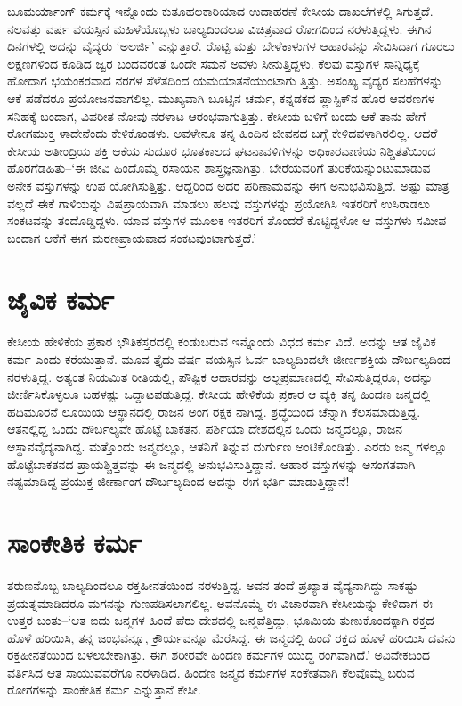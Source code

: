 ಬೂಮರ್ಯಾಂಗ್ ಕರ್ಮಕ್ಕೆ ಇನ್ನೊಂದು ಕುತೂಹಲಕಾರಿಯಾದ ಉದಾಹರಣೆ ಕೇಸೀಯ ದಾಖಲೆಗಳಲ್ಲಿ ಸಿಗುತ್ತದೆ. ನಲವತ್ತು ವರ್ಷ ವಯಸ್ಸಿನ ಮಹಿಳೆಯೊಬ್ಬಳು ಬಾಲ್ಯದಿಂದಲೂ ವಿಚಿತ್ರವಾದ ರೋಗದಿಂದ ನರಳುತ್ತಿದ್ದಳು. ಈಗಿನ ದಿನಗಳಲ್ಲಿ ಅದನ್ನು ವೈದ್ಯರು ‘ಅಲರ್ಜಿ’ ಎನ್ನುತ್ತಾರೆ. ರೊಟ್ಟಿ ಮತ್ತು ಬೇಳೆಕಾಳುಗಳ ಆಹಾರವನ್ನು ಸೇವಿಸಿದಾಗ ಗೂರಲು ಲಕ್ಷಣಗಳಿಂದ ಕೂಡಿದ ಜ್ವರ ಬಂದವರಂತೆ ಒಂದೇ ಸಮನೆ ಅವಳು ಸೀನುತ್ತಿದ್ದಳು. ಕೆಲವು ವಸ್ತುಗಳ ಸಾನ್ನಿಧ್ಯಕ್ಕೆ ಹೋದಾಗ ಭಯಂಕರವಾದ ನರಗಳ ಸೆಳೆತದಿಂದ ಯಮಯಾತನೆಯುಂಟಾಗು ತ್ತಿತ್ತು. ಅಸಂಖ್ಯ ವೈದ್ಯರ ಸಲಹೆಗಳನ್ನು ಆಕೆ ಪಡೆದರೂ ಪ್ರಯೋಜನವಾಗಲಿಲ್ಲ. ಮುಖ್ಯವಾಗಿ ಬೂಟ್ಸಿನ ಚರ್ಮ, ಕನ್ನಡಕದ ಪ್ಲಾಸ್ಟಿಕ್​ನ ಹೊರ ಆವರಣಗಳ ಸನಿಹಕ್ಕೆ ಬಂದಾಗ, ವಿಪರೀತ ನೋವು ನರಳಾಟ ಆರಂಭವಾಗುತ್ತಿತ್ತು. ಕೇಸೀಯ ಬಳಿಗೆ ಬಂದು ಆಕೆ ತಾನು ಹೇಗೆ ರೋಗಮುಕ್ತ ಳಾದೇನೆಂದು ಕೇಳಿಕೊಂಡಳು. ಅವಳೇನೂ ತನ್ನ ಹಿಂದಿನ ಜೀವನದ ಬಗ್ಗೆ ಕೇಳಿದವಳಾಗಿರಲಿಲ್ಲ. ಆದರೆ ಕೇಸೀಯ ಅತೀಂದ್ರಿಯ ಶಕ್ತಿ ಆಕೆಯ ಸುದೂರ ಭೂತಕಾಲದ ಘಟನಾವಳಿಗಳನ್ನು ಅಧಿಕಾರವಾಣಿಯ ನಿಶ್ಚಿತತೆಯಿಂದ ಹೊರಗೆಡಹಿತು–‘ಈ ಜೀವಿ ಹಿಂದೊಮ್ಮೆ ರಸಾಯನ ಶಾಸ್ತ್ರಜ್ಞನಾಗಿತ್ತು. ಬೇರೆಯವರಿಗೆ ತುರಿಕೆಯನ್ನುಂಟುಮಾಡುವ ಅನೇಕ ವಸ್ತುಗಳನ್ನು ಉಪ ಯೋಗಿಸುತ್ತಿತ್ತು. ಆದ್ದರಿಂದ ಅದರ ಪರಿಣಾಮವನ್ನು ಈಗ ಅನುಭವಿಸುತ್ತಿದೆ. ಅಷ್ಟು ಮಾತ್ರ ವಲ್ಲದೆ ಈಕೆ ಗಾಳಿಯನ್ನು ವಿಷಪ್ರಾಯವಾಗಿ ಮಾಡಲು ಹಲವು ವಸ್ತುಗಳನ್ನು ಪ್ರಯೋಗಿಸಿ ಇತರರಿಗೆ ಉಸಿರಾಡಲು ಸಂಕಟವನ್ನು ತಂದೊಡ್ಡಿದ್ದಳು. ಯಾವ ವಸ್ತುಗಳ ಮೂಲಕ ಇತರರಿಗೆ ತೊಂದರೆ ಕೊಟ್ಟಿದ್ದಳೋ ಆ ವಸ್ತುಗಳು ಸಮೀಪ ಬಂದಾಗ ಆಕೆಗೆ ಈಗ ಮರಣಪ್ರಾಯವಾದ ಸಂಕಟವುಂಟಾಗುತ್ತದೆ.’


\section{ಜೈವಿಕ ಕರ್ಮ}

ಕೇಸೀಯ ಹೇಳಿಕೆಯ ಪ್ರಕಾರ ಭೌತಿಕಸ್ತರದಲ್ಲಿ ಕಂಡುಬರುವ ಇನ್ನೊಂದು ವಿಧದ ಕರ್ಮ ವಿದೆ. ಅದನ್ನು ಆತ ಜೈವಿಕ ಕರ್ಮ  ಎಂದು ಕರೆಯುತ್ತಾನೆ. ಮೂವ ತ್ತೈದು ವರ್ಷ ವಯಸ್ಸಿನ ಓರ್ವ ಬಾಲ್ಯದಿಂದಲೇ ಜೀರ್ಣಶಕ್ತಿಯ ದೌರ್ಬಲ್ಯದಿಂದ ನರಳುತ್ತಿದ್ದ. ಅತ್ಯಂತ ನಿಯಮಿತ ರೀತಿಯಲ್ಲಿ, ಪೌಷ್ಟಿಕ ಆಹಾರವನ್ನು ಅಲ್ಪಪ್ರಮಾಣದಲ್ಲಿ ಸೇವಿಸುತ್ತಿದ್ದರೂ, ಅದನ್ನು ಜೀರ್ಣಿಸಿಕೊಳ್ಳಲೂ ಬಹಳಷ್ಟು ಒದ್ದಾಟಪಡುತ್ತಿದ್ದ. ಕೇಸೀಯ ಹೇಳಿಕೆಯ ಪ್ರಕಾರ ಆ ವ್ಯಕ್ತಿ ತನ್ನ ಹಿಂದಣ ಜನ್ಮದಲ್ಲಿ ಹದಿಮೂರನೆ ಲೂಯಿಯ ಆಸ್ಥಾನದಲ್ಲಿ ರಾಜನ ಅಂಗ ರಕ್ಷಕ ನಾಗಿದ್ದ. ಶ್ರದ್ಧೆಯಿಂದ ಚೆನ್ನಾಗಿ ಕೆಲಸಮಾಡುತ್ತಿದ್ದ. ಆತನಲ್ಲಿದ್ದ ಒಂದು ದೌರ್ಬಲ್ಯವೇ ಹೊಟ್ಟೆ ಬಾಕತನ. ಪರ್ಶಿಯಾ ದೇಶದಲ್ಲಿನ ಒಂದು ಜನ್ಮದಲ್ಲೂ, ರಾಜನ ಆಸ್ಥಾನವೈದ್ಯನಾಗಿದ್ದ. ಮತ್ತೊಂದು ಜನ್ಮದಲ್ಲೂ, ಆತನಿಗೆ ತಿನ್ನುವ ದುರ್ಗುಣ ಅಂಟಿಕೊಂಡಿತ್ತು. ಎರಡು ಜನ್ಮ ಗಳಲ್ಲೂ ಹೊಟ್ಟೆಬಾಕತನದ ಪ್ರಾಯಶ್ಚಿತ್ತವನ್ನು ಈ ಜನ್ಮದಲ್ಲಿ ಅನುಭವಿಸುತ್ತಿದ್ದಾನೆ. ಆಹಾರ ವಸ್ತುಗಳನ್ನು ಅಸಂಗತವಾಗಿ ನಷ್ಟಮಾಡಿದ್ದ ಪ್ರಯುಕ್ತ ಜೀರ್ಣಾಂಗ ದೌರ್ಬಲ್ಯದಿಂದ ಅದನ್ನು ಈಗ ಭರ್ತಿ ಮಾಡುತ್ತಿದ್ದಾನೆ!


\section{ಸಾಂಕೇತಿಕ ಕರ್ಮ}

ತರುಣನೊಬ್ಬ ಬಾಲ್ಯದಿಂದಲೂ ರಕ್ತಹೀನತೆಯಿಂದ ನರಳುತ್ತಿದ್ದ. ಅವನ ತಂದೆ ಪ್ರಖ್ಯಾತ ವೈದ್ಯನಾಗಿದ್ದು ಸಾಕಷ್ಟು ಪ್ರಯತ್ನಮಾಡಿದರೂ ಮಗನನ್ನು ಗುಣಪಡಿಸಲಾಗಲಿಲ್ಲ. ಅವನೊಮ್ಮೆ ಈ ವಿಚಾರವಾಗಿ ಕೇಸೀಯನ್ನು ಕೇಳಿದಾಗ ಈ ಉತ್ತರ ಬಂತು–‘ಆತ ಐದು ಜನ್ಮಗಳ ಹಿಂದೆ ಪೆರು ದೇಶದಲ್ಲಿ ಜನ್ಮವೆತ್ತಿದ್ದು, ಭೂಮಿಯ ತುಣುಕೊಂದಕ್ಕಾಗಿ ರಕ್ತದ ಹೊಳೆ ಹರಿಯಿಸಿ, ತನ್ನ ಜಂಭವನ್ನೂ, ಕ್ರೌರ್ಯವನ್ನೂ ಮೆರೆಸಿದ್ದ. ಈ ಜನ್ಮದಲ್ಲಿ ಹಿಂದೆ ರಕ್ತದ ಹೊಳೆ ಹರಿಯಿಸಿ ದವನು ರಕ್ತಹೀನತೆಯಿಂದ ಬಳಲಬೇಕಾಗಿತ್ತು. ಈಗ ಶರೀರವೇ ಹಿಂದಣ ಕರ್ಮಗಳ ಯುದ್ಧ ರಂಗವಾಗಿದೆ.’ ಅವಿವೇಕದಿಂದ ವರ್ತಿಸಿದ ಆತ ಸಾಯುವವರೆಗೂ ನರಳಾಡಿದ. ಹಿಂದಣ ಜನ್ಮದ ಕರ್ಮಗಳ ಸಂಕೇತವಾಗಿ ಕೆಲವೊಮ್ಮೆ ಬರುವ ರೋಗಗಳನ್ನು ಸಾಂಕೇತಿಕ ಕರ್ಮ  ಎನ್ನುತ್ತಾನೆ ಕೇಸೀ.


